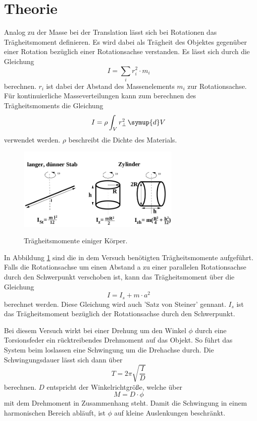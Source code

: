 \section{Theorie}
\label{sec:Theorie}
Analog zu der Masse bei der Translation lässt sich bei Rotationen das Trägheitsmoment definieren. Es wird dabei als Trägheit des Objektes gegenüber einer Rotation bezüglich einer Rotationsachse verstanden. Es lässt sich durch die Gleichung 
\begin{equation}
    I=\sum_{i}r_i^2\cdot m_i
\end{equation}
berechnen. $r_i$ ist dabei der Abstand des Massenelements $m_i$ zur Rotationsachse.
Für kontinuierliche Masseverteilungen kann zum berechnen des Trägheitsmoments die Gleichung
\begin{equation}
    I=\rho\int_V r_\perp^2 \,\symup{d}V
\end{equation}
verwendet werden. $\rho$ beschreibt die Dichte des Materials.


\begin{figure}
    \caption{Trägheitsmomente einiger Körper.}
    \centering
    \includegraphics[height=4cm]{data/Probekoerper.png}
    \label{fig:probe}
\end{figure}


In Abbildung \ref{fig:probe} sind die in dem Versuch benötigten Trägheitsmomente aufgeführt. 
Falls die Rotationsachse um einen Abstand a zu einer parallelen Rotationsachse durch den Schwerpunkt verschoben ist, kann das Trägheitsmoment über die Gleichung
\begin{equation}
\label{eqn:stein}
    I=I_s+m\cdot a^2
\end{equation}
berechnet werden. Diese Gleichung wird auch 'Satz von Steiner' gennant.  $I_s$ ist das Trägheitsmoment bezüglich der Rotationsachse durch den Schwerpunkt.


Bei diesem Versuch wirkt bei einer Drehung um den Winkel $\phi$ durch eine Torsionsfeder ein rücktreibendes Drehmoment auf das Objekt. So führt das System beim loslassen eine Schwingung um die Drehachse durch. Die Schwingungsdauer lässt sich dann über 
\begin{equation}
\label{eqn:T}
    T=2\pi \sqrt{\frac{I}{D}}
\end{equation}
berechnen. $D$ entspricht der Winkelrichtgröße, welche über  
\begin{equation}
\label{eqn:M}
    M=D\cdot \phi
\end{equation}
mit dem Drehmoment in Zusammenhang steht.
Damit die Schwingung in einem harmonischen Bereich abläuft, ist $\phi$ auf kleine Auslenkungen beschränkt.


